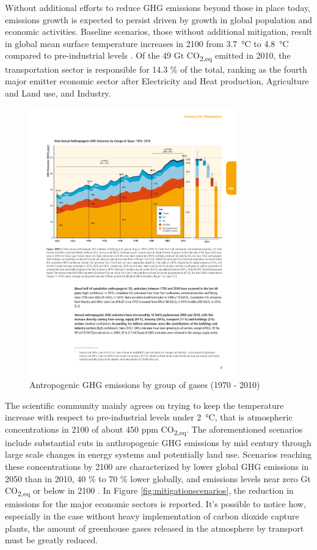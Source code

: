 Without additional efforts to reduce GHG emissions beyond those in place today, emissions growth is expected to persist driven by growth in global population and economic activities. Baseline scenarios, those without additional mitigation, result in global mean surface temperature increases in 2100 from \SI{3.7}{\celsius}  to \SI{4.8}{\celsius}  compared to pre-industrial levels \cite{IPCC2014}. Of the 49 Gt CO\textsubscript{2,eq} emitted in 2010, the transportation sector is responsible for 14.3 \% of the total, ranking as the fourth major emitter economic sector after Electricity and Heat production, Agriculture and Land use, and Industry.

\begin{figure}[h]
  \centering
\includegraphics[width=0.8\textwidth]{figures/introduction/antropogenic_ghg_emissions.pdf}
  \caption{Antropogenic GHG emissions by group of gases (1970 - 2010) \cite{IPCC2014}}
  \label{antropogenic_ghg_emissions}
\end{figure}

The scientific community mainly agrees on trying to keep the temperature increase with respect to pre-industrial levels under \SI{2}{\celsius}, that is atmospheric concentrations in 2100 of about 450 ppm CO\textsubscript{2,eq}. The aforementioned scenarios include substantial cuts in anthropogenic GHG emissions by mid century through large scale changes in energy systems and potentially land use. Scenarios reaching these concentrations by 2100 are characterized by lower global GHG emissions in 2050 than in 2010, 40 \% to 70 \% lower globally, and emissions levels near zero Gt CO\textsubscript{2,eq} or below in 2100 \cite{IPCC2014}. In Figure \ref{fig:mitigationscenarios}, the reduction in emissions for the major economic sectors is reported. It's possible to notice how, especially in the case without heavy implementation of carbon dioxide capture plants, the amount of greenhouse gases released in the atmosphere by transport must be greatly reduced.

